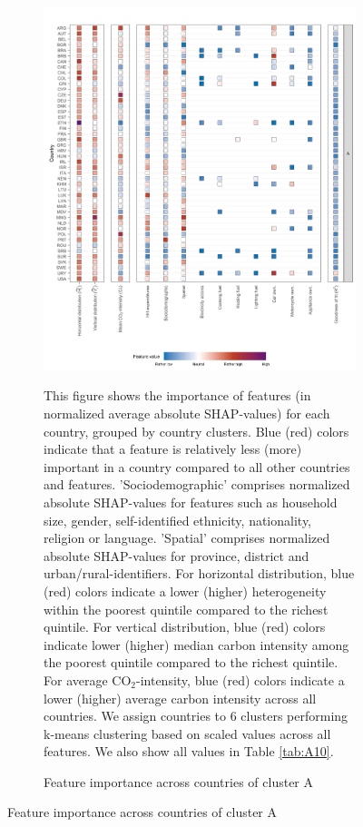 \documentclass[12pt, a4paper]{article}
\newenvironment{subcaption2}
{\strut
\vspace{-5pt}
\begin{minipage}[b]{0.9\textwidth}
  \hspace*{-\parindent}
  \footnotesize}
 {\end{minipage}}
\begin{document}
\begin{figure}[ht!]
    \centering
    \caption{Feature importance across countries by cluster}\label{fig:fig_4}
    \begin{subfigure}[b]{\textwidth}
    \centering
    \caption{Feature importance across countries of cluster A}\label{fig:fig_4_1}
    \includegraphics{1_Figures/Figure 4/Figure_4_Corrected_1.jpg}
     \begin{subcaption2}
    This figure shows the importance of features (in normalized average absolute SHAP-values) for each country, grouped by country clusters. Blue (red) colors indicate that a feature is relatively less (more) important in a country compared to all other countries and features. 'Sociodemographic' comprises normalized absolute SHAP-values for features such as household size, gender, self-identified ethnicity, nationality, religion or language. 'Spatial' comprises normalized absolute SHAP-values for province, district and urban/rural-identifiers. For horizontal distribution, blue (red) colors indicate a lower (higher) heterogeneity within the poorest quintile compared to the richest quintile. For vertical distribution, blue (red) colors indicate lower (higher) median carbon intensity among the poorest quintile compared to the richest quintile. For average CO$_{2}$-intensity, blue (red) colors indicate a lower (higher) average carbon intensity across all countries.
    We assign countries to 6 clusters performing k-means clustering based on scaled values across all features. We also show all values in Table \ref{tab:A10}.
    \end{subcaption2}
    \end{subfigure}
\end{figure}
\clearpage
\end{document}
